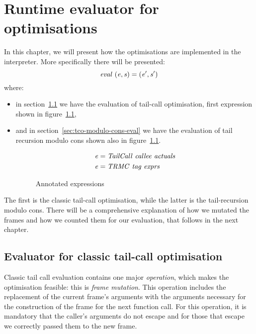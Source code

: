 \documentclass[diploma]{softlab-thesis}
\begin{document}
\chapter {Runtime evaluator for optimisations}
\label{ch:evaluator}

In this chapter, we will present how the optimisations are implemented in the interpreter.
More specifically there will be presented:
\[ \mathit{eval \hfill\ (e, s) = (e', s')} \]
where:
\begin{itemize}
\item in section~\ref{sec:classic-tco-eval} we have the evaluation of tail-call optimisation, first expression 
      shown in figure~\ref{fig:annos},
\item and in section~\ref{sec:tco-modulo-cons-eval} we have the evaluation of tail recursion modulo cons shown
      also in figure~\ref{fig:annos}.
\begin{figure}[h]
  \begin{align*}
    & \mathit{e = TailCall \hfill\ callee \hfill\ actuals} \\
    & \mathit{e = TRMC \hfill\ tag \hfill\ exprs} 
  \end{align*}
\caption{Annotated expressions\label{fig:annos}}
\end{figure}

\end{itemize}
The first is the classic tail-call optimisation, while the latter is the tail-recursion 
modulo cons. There will be a comprehensive explanation of how we mutated the frames and how we counted them for 
our evaluation, that follows in the next chapter.

\section {Evaluator for classic tail-call optimisation}
\label{sec:classic-tco-eval}

Classic tail call evaluation contains one major \textit{operation}, which makes the optimisation 
feasible: this is \textit{frame mutation}. This operation includes the replacement of the current frame's arguments 
with the arguments necessary for the construction of the frame for the next function call. For this operation,
it is mandatory that the caller's arguments do not escape and for those that escape we correctly passed them 
to the new frame. 
\end{document}
